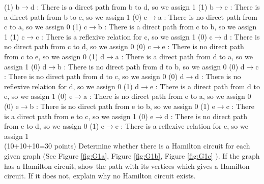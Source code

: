 \documentclass[a4 paper]{article}
\numberwithin{equation}{section}
\newcommand{\problem}[2]{~\\\fbox{\textbf{Problem #1}}\hfill (#2 points)\newline\newline}
\newcommand{\0}{\mathbf{0}}
\begin{document}
(1) b$\to$d : There is a direct path from b to d, so we assign 1
\newline
(1) b$\to$e : There is a direct path from b to e, so we assign 1
\newline\newline
(0) c$\to$a : There is no direct path from c to a, so we assign 0
\newline
(1) c$\to$b : There is a direct path from c to b, so we assign 1
\newline
(1) c$\to$c : There is a reflexive relation for c, so we assign 1
\newline
(0) c$\to$d : There is no direct path from c to d, so we assign 0
\newline
(0) c$\to$e : There is no direct path from c to e, so we assign 0
\newline\newline
(1) d$\to$a : There is a direct path from d to a, so we assign 1
\newline
(0) d$\to$b : There is no direct path from d to b, so we assign 0
\newline
(0) d$\to$c : There is no direct path from d to c, so we assign 0
\newline
(0) d$\to$d : There is no reflexive relation for d, so we assign 0
\newline
(1) d$\to$e : There is a direct path from d to e, so we assign 1
\newline\newline
(0) e$\to$a : There is no direct path from e to a, so we assign 0
\newline
(0) e$\to$b : There is no direct path from e to b, so we assign 0
\newline
(1) e$\to$c : There is a direct path from e to c, so we assign 1
\newline
(0) e$\to$d : There is no direct path from e to d, so we assign 0
\newline
(1) e$\to$e : There is a reflexive relation for e, so we assign 1
\newline\newline
\problem{2: Hamilton Circuits}{10+10+10=30}
Determine whether there is a Hamilton circuit for each given graph (See Figure \ref{fig:G1a}, Figure \ref{fig:G1b}, Figure \ref{fig:G1c} ). If the graph has a Hamilton circuit, show the path with its vertices which gives a Hamilton circuit. If it does not, explain why no Hamilton circuit exists. \newline
\end{document}

